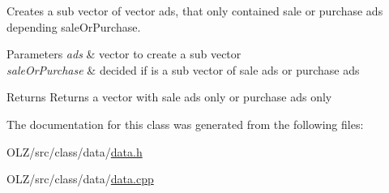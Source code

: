Creates a sub vector of vector ads, that only contained sale or purchase ads depending sale\+Or\+Purchase. 


\begin{DoxyParams}{Parameters}
{\em ads} & vector to create a sub vector \\
\hline
{\em sale\+Or\+Purchase} & decided if is a sub vector of sale ads or purchase ads\\
\hline
\end{DoxyParams}
\begin{DoxyReturn}{Returns}
Returns a vector with sale ads only or purchase ads only 
\end{DoxyReturn}


The documentation for this class was generated from the following files\+:\begin{DoxyCompactItemize}
\item 
O\+L\+Z/src/class/data/\hyperlink{data_8h}{data.\+h}\item 
O\+L\+Z/src/class/data/\hyperlink{data_8cpp}{data.\+cpp}\end{DoxyCompactItemize}
